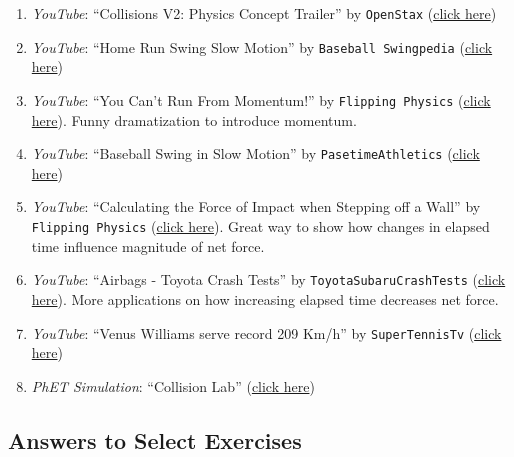 \documentclass[main.tex]{subfiles}
\begin{document}
\begin{enumerate}
\setlength\itemsep{0.1ex}
    \item \textit{YouTube}: ``Collisions V2: Physics Concept Trailer'' by \texttt{OpenStax} (\href{https://youtu.be/hxMaoFcYSrw}{click here})
    \item \textit{YouTube}: ``Home Run Swing Slow Motion'' by \texttt{Baseball Swingpedia} (\href{https://youtu.be/4cdbV6m_49U}{click here})
    \item \textit{YouTube}: ``You Can't Run From Momentum!'' by \texttt{Flipping Physics} (\href{https://youtu.be/K-lH-DoD6Tk}{click here}). Funny dramatization to introduce momentum. 
    \item \textit{YouTube}: ``Baseball Swing in Slow Motion'' by \texttt{PasetimeAthletics} (\href{https://youtu.be/jvY06zoY0M4}{click here})
    \item \textit{YouTube}: ``Calculating the Force of Impact when Stepping off a Wall'' by \texttt{Flipping Physics} (\href{https://youtu.be/ILIFo2X7EUY}{click here}). Great way to show how changes in elapsed time influence magnitude of net force.
    \item \textit{YouTube}: ``Airbags - Toyota Crash Tests'' by \texttt{ToyotaSubaruCrashTests} (\href{https://youtu.be/Bw0Ps8-KDlQ}{click here}). More applications on how increasing elapsed time decreases net force.
    \item \textit{YouTube}: ``Venus Williams serve record 209 Km/h'' by \texttt{SuperTennisTv} (\href{https://youtu.be/6b1NSgQZvdo}{click here})
    \item \textit{PhET Simulation}: ``Collision Lab'' (\href{https://phet.colorado.edu/en/simulations/collision-lab}{click here})
\end{enumerate}

\clearpage


\subsection{Answers to Select Exercises}
\end{document}
